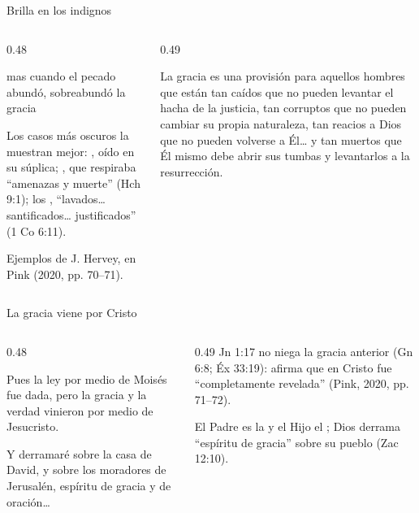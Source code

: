 \begin{frame}{Brilla en los indignos}
\begin{columns}[t,onlytextwidth]
\begin{column}{0.48\textwidth}
\begin{cita}mas cuando el pecado abundó, sobreabundó la gracia\end{cita}
\small Los casos más oscuros la muestran mejor: , oído en su súplica; , que respiraba ``amenazas y muerte'' (Hch 9:1); los , ``lavados\ldots{} santificados\ldots{} justificados'' (1 Co 6:11).\par
{\scriptsize\color{gris}Ejemplos de J. Hervey, en Pink (2020, pp. 70--71).}
\end{column}
\begin{column}{0.49\textwidth}
\scriptsize\begin{cita}[colback=dorado!8!papiro,colframe=dorado!85!azul]
La gracia es una provisión para aquellos hombres que están tan caídos que no pueden levantar el hacha de la justicia, tan corruptos que no pueden cambiar su propia naturaleza, tan reacios a Dios que no pueden volverse a Él\ldots{} y tan muertos que Él mismo debe abrir sus tumbas y levantarlos a la resurrección.\end{cita}
\end{column}
\end{columns}
\end{frame}

\begin{frame}{La gracia viene por Cristo}
\begin{columns}[t,onlytextwidth]
\begin{column}{0.48\textwidth}
\begin{cita}Pues la ley por medio de Moisés fue dada, pero la gracia y la verdad vinieron por medio de Jesucristo.\end{cita}
\begin{cita}Y derramaré sobre la casa de David, y sobre los moradores de Jerusalén, espíritu de gracia y de oración\ldots{}\end{cita}
\end{column}
\begin{column}{0.49\textwidth}\small
Jn 1:17 no niega la gracia anterior (Gn 6:8; Éx 33:19): afirma que en Cristo fue ``completamente revelada'' (Pink, 2020, pp. 71--72).\par\medskip
El Padre es la  y el Hijo el ; Dios derrama ``espíritu de gracia'' sobre su pueblo (Zac 12:10).\par\smallskip
{}
\end{column}
\end{columns}
\end{frame}

